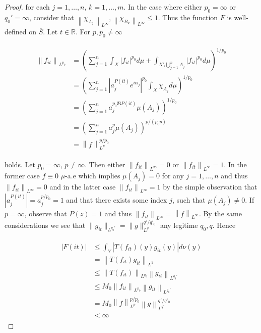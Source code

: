 \begin{proof}
for each $j = 1,\hdots,n$, $k = 1,\hdots,m$. In the case where either $p_0 = \infty$ or $q_0' = \infty$, consider that $\left\|\chi_{A_j} \right\|_{L^\infty}, \left\|\chi_{B_k}\right\|_{L^\infty} \leqslant 1 $. Thus the function $F$ is well-defined on $\overline{S}$. Let $t \in \mathbb{R}$. For $p,p_0 \neq \infty$

\begin{gather}
	\begin{aligned}
		\left\|f_{it}\right\|_{L^{p_0}} &= \left(\sum_{j = 1}^n \int_X \left| f_{it} \right|^{p_0} d\mu + \int_{X \setminus \bigcup_{j = 1}^n A_j} \left| f_{it} \right|^{p_0} d\mu\right)^{1/p_0}\\
		&= \left(\sum_{j = 1}^n \left| a_j^{P(it)} e^{i\alpha_j}\right|^{p_0}\int_X \chi_{A_j} d\mu\right)^{1/p_0}\\
		&= \left(\sum_{j = 1}^n a_j^{p_0\Re P(it)}\mu\left(A_j\right)\right)^{1/p_0}\\
		&= \left(\sum_{j = 1}^n a_j^p\mu\left(A_j\right)\right)^{p/\left(p_0p\right)}\\
		&= \left\|f\right\|_{L^p}^{p/p_0} 
	\end{aligned}
\end{gather}

holds. Let $p_0 = \infty$, $p \neq \infty$. Then either $\left\|f_{it}\right\|_{L^{\infty}} = 0$ or $\left\|f_{it}\right\|_{L^{\infty}} = 1$. In the former case $f \equiv 0$ $\mu$-a.e which implies $\mu\left( A_j \right) = 0$ for any $j = 1,\hdots,n$ and thus $\left\| f_{it}\right\|_{L^{\infty}} = 0$ and in the latter case $\left\| f_{it} \right\|_{L^{\infty}} = 1$ by the simple observation that $\left| a_j^{P(it)}\right| = a_j^{p/p_0} = 1$ and that there exists some index $j$, such that $\mu\left( A_j \right) \neq 0$. If $p = \infty$, observe that $P(z) = 1$ and thus $\left\| f_{it}\right\|_{L^{\infty}} = \left\| f\right\|_{L^{\infty}}$. By the same considerations we see that $\|g_{it}\|_{L^{q_0'}} = \|g\|_{L^{q'}}^{q'/q'_0}$ any legitime $q_0,q$. Hence

\begin{gather}
	\begin{aligned}
		\left| F(it) \right| &\leqslant \int_Y \left| T(f_{it})(y)g_{it}(y)\right| d\nu(y)\\
		&= \left\|T(f_{it}) g_{it}\right\|_{L^1}\\
		&\leqslant \left\|T(f_{it})\right\|_{L^{q_0}}\left\|g_{it}\right\|_{L^{q_0'}}\\
		&\leqslant M_0 \left\|f_{it}\right\|_{L^{p_0}} \left\|g_{it}\right\|_{L^{q_0'}}\\
		&= M_0 \left\|f\right\|_{L^p}^{p/p_0} \left\|g\right\|_{L^{q'}}^{q'/q'_0}\\
		&< \infty
	\end{aligned}
\end{gather}


\end{proof}
